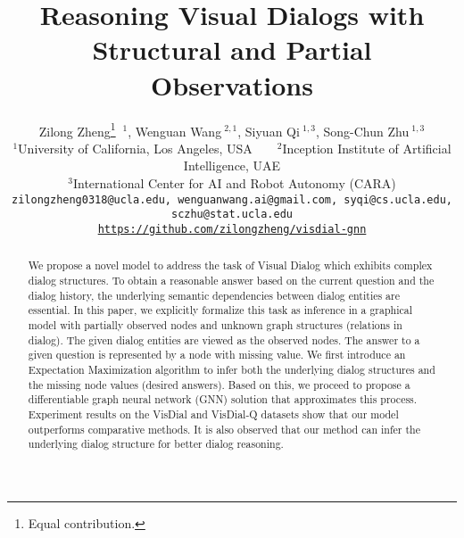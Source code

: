 \documentclass[10pt,twocolumn,letterpaper]{article}
\begin{document}
\title{Reasoning Visual Dialogs with Structural and Partial Observations}

\author{Zilong Zheng\thanks{Equal contribution.} $~^{1}$, Wenguan Wang\footnotemark[1] $~^{2,1}$, Siyuan Qi\footnotemark[1] $~^{1,3}$, Song-Chun Zhu$~^{1,3}$\\
$^1$\small University of California, Los Angeles, USA~~~~$^2$\small Inception Institute of Artificial Intelligence, UAE\\
$^3$\small International Center for AI and Robot Autonomy (CARA)\\
{\tt\small zilongzheng0318@ucla.edu, wenguanwang.ai@gmail.com, syqi@cs.ucla.edu, sczhu@stat.ucla.edu}\\
{\tt\small \url{https://github.com/zilongzheng/visdial-gnn}}
}

\maketitle

\thispagestyle{empty}

\begin{abstract}
We propose a novel model to address the task of Visual Dialog which exhibits complex dialog structures. To obtain a reasonable answer based on the current question and the dialog history, the underlying semantic dependencies between dialog entities are essential.
In this paper, we explicitly formalize this task as inference in a graphical model with partially observed nodes and unknown graph structures (relations in dialog). The given dialog entities are viewed as the observed nodes. The answer to a given question is represented by a node with missing value.
We first introduce an Expectation Maximization algorithm to infer both the underlying dialog structures and the missing node values (desired answers). Based on this, we proceed to propose a differentiable graph neural network (GNN) solution that approximates this process.
Experiment results on the VisDial and VisDial-Q datasets show that our model outperforms comparative methods. It is also observed that our method can infer the underlying dialog structure for better dialog reasoning.
\end{abstract}

\vspace{-3pt}
\end{document}
